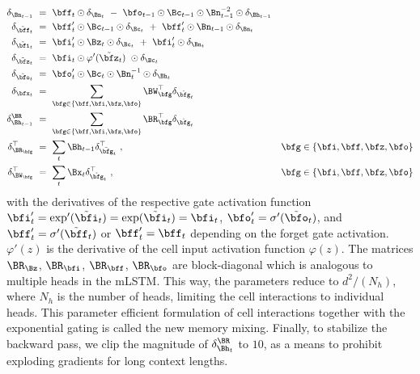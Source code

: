 \documentclass[dvipsnames]{article}
\begin{document}
\begin{appendix}
\begin{align}
		\delta_{\Bn_{t-1}} \ &= \ \bff_{t} \odot \delta_{\Bn_{t}} \ - \ \bfo_{t-1} \odot \Bc_{t-1} \odot \Bn_{t-1}^{-2}  \odot \delta_{\Bh_{t-1}} & \\
\delta_{\tilde{\bff}_{t}} \ &= \ \bff'_{t} \odot \Bc_{t-1} \odot \delta_{\Bc_{t}}  \ + \ \bff'_{t} \odot \Bn_{t-1} \odot \delta_{\Bn_{t}}  & \\
\delta_{\tilde{\bfi}_{t}} \ &= \ \bfi'_{t} \odot \Bz_{t} \odot \delta_{\Bc_{t}} \ + \  \bfi'_{t} \odot \delta_{\Bn_{t}} & \\
\delta_{\tilde{\bfz}_{t}} \ &= \ \bfi_{t} \odot \varphi'(\tilde{\bfz}_t) \ \odot \delta_{\Bc_{t}} & \\
\delta_{\tilde{\bfo}_{t}} \ &= \ \bfo'_{t} \odot \Bc_{t} \odot \Bn^{-1}_{t} \odot \delta_{\Bh_{t}}  & \\
\delta_{\bfx_t} \ &= \ \sum_{\bfg \in \{\bff, \bfi, \bfz, \bfo\}} \BW^{\top}_{\bfg} \delta_{\tilde{\bfg}_t} & \\
\delta^{\BR}_{\Bh_{t-1}} \ &= \ \sum_{\bfg \in \{\bff, \bfi, \bfz, \bfo\}} \BR^{\top}_{\bfg} \delta_{\tilde{\bfg}_{t}} &\\
\delta_{\BR_\bfg}^\top \ &= \ \sum_t \Bh_{t-1} \delta_{\tilde{\bfg}_{t}}^\top \ , & \bfg \in \{\bfi, \bff, \bfz, \bfo\}\\
\delta_{\BW_\bfg}^\top \ &= \ \sum_t \Bx_{t} \delta_{\tilde{\bfg}_{t}}^\top \ , &  \bfg \in \{\bfi, \bff, \bfz, \bfo\}
\end{align}
with the derivatives of the respective gate activation function $\bfi'_t = \exp' (\tilde{\bfi}_t ) = \exp (\tilde{\bfi}_t ) = \bfi_t $, $\bfo'_t = \sigma' (\tilde{\bfo}_t) $, and $\bff'_t = \sigma'(\tilde{\bff}_t) $ or $\bff'_t = \bff_t$ depending on the forget gate activation. $\varphi'(z)$ is the derivative of the cell input activation function $\varphi(z)$.
The matrices $\BR_{\Bz}$, $\BR_{\bfi}$, $\BR_{\bff}$, $\BR_{\bfo}$ are block-diagonal which is analogous to multiple heads in the mLSTM. This way, the parameters reduce to $d^2/(N_h)$, where $N_h$ is the number of heads, limiting the cell interactions to individual heads. This parameter efficient formulation of cell interactions together with the exponential gating is called the new memory mixing. Finally, to stabilize the backward pass, we clip the magnitude of $\delta^{\BR}_{\Bh_t}$ to $10$, as a means to prohibit exploding gradients for long context lengths.

\end{appendix}
\end{document}
